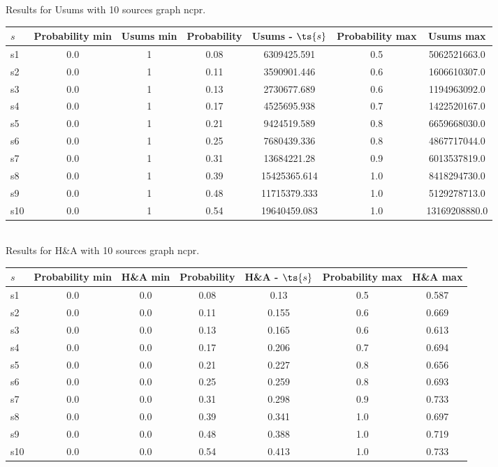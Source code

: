 \documentclass{article}
\begin{document}
\noindent Results for Usums with 10 sources graph ncpr.

\noindent\begin{tabular}{|l|c|c|c|c|c|c|}
\hline
$s$& Probability min & Usums min & Probability & Usums - $\ts{s}$ & Probability max & Usums max\\
\hline
s1 &0.0 & 1 & 0.08 & 6309425.591 & 0.5 & 5062521663.0\\
\hline
s2 &0.0 & 1 & 0.11 & 3590901.446 & 0.6 & 1606610307.0\\
\hline
s3 &0.0 & 1 & 0.13 & 2730677.689 & 0.6 & 1194963092.0\\
\hline
s4 &0.0 & 1 & 0.17 & 4525695.938 & 0.7 & 1422520167.0\\
\hline
s5 &0.0 & 1 & 0.21 & 9424519.589 & 0.8 & 6659668030.0\\
\hline
s6 &0.0 & 1 & 0.25 & 7680439.336 & 0.8 & 4867717044.0\\
\hline
s7 &0.0 & 1 & 0.31 & 13684221.28 & 0.9 & 6013537819.0\\
\hline
s8 &0.0 & 1 & 0.39 & 15425365.614 & 1.0 & 8418294730.0\\
\hline
s9 &0.0 & 1 & 0.48 & 11715379.333 & 1.0 & 5129278713.0\\
\hline
s10 &0.0 & 1 & 0.54 & 19640459.083 & 1.0 & 13169208880.0\\
\hline
\end{tabular}\\

\noindent Results for H\&A with 10 sources graph ncpr.

\noindent\begin{tabular}{|l|c|c|c|c|c|c|}
\hline
$s$& Probability min & H\&A min & Probability & H\&A - $\ts{s}$ & Probability max & H\&A max\\
\hline
s1 &0.0 & 0.0 & 0.08 & 0.13 & 0.5 & 0.587\\
\hline
s2 &0.0 & 0.0 & 0.11 & 0.155 & 0.6 & 0.669\\
\hline
s3 &0.0 & 0.0 & 0.13 & 0.165 & 0.6 & 0.613\\
\hline
s4 &0.0 & 0.0 & 0.17 & 0.206 & 0.7 & 0.694\\
\hline
s5 &0.0 & 0.0 & 0.21 & 0.227 & 0.8 & 0.656\\
\hline
s6 &0.0 & 0.0 & 0.25 & 0.259 & 0.8 & 0.693\\
\hline
s7 &0.0 & 0.0 & 0.31 & 0.298 & 0.9 & 0.733\\
\hline
s8 &0.0 & 0.0 & 0.39 & 0.341 & 1.0 & 0.697\\
\hline
s9 &0.0 & 0.0 & 0.48 & 0.388 & 1.0 & 0.719\\
\hline
s10 &0.0 & 0.0 & 0.54 & 0.413 & 1.0 & 0.733\\
\hline
\end{tabular}\\
\end{document}
